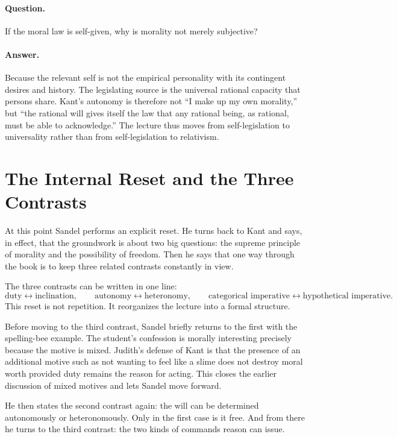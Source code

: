 \paragraph{Question.} If the moral law is self-given, why is morality not merely subjective?

\paragraph{Answer.} Because the relevant self is not the empirical personality with its contingent desires and history. The legislating source is the universal rational capacity that persons share. Kant's autonomy is therefore not ``I make up my own morality,'' but ``the rational will gives itself the law that any rational being, as rational, must be able to acknowledge.'' The lecture thus moves from self-legislation to universality rather than from self-legislation to relativism.

\section{The Internal Reset and the Three Contrasts}

At this point Sandel performs an explicit reset. He turns back to Kant and says, in effect, that the groundwork is about two big questions: the supreme principle of morality and the possibility of freedom. Then he says that one way through the book is to keep three related contrasts constantly in view.

The three contrasts can be written in one line:
\begin{equation}
\text{duty} \leftrightarrow \text{inclination},
\qquad
\text{autonomy} \leftrightarrow \text{heteronomy},
\qquad
\text{categorical imperative} \leftrightarrow \text{hypothetical imperative}.
\end{equation}
This reset is not repetition. It reorganizes the lecture into a formal structure.

Before moving to the third contrast, Sandel briefly returns to the first with the spelling-bee example. The student's confession is morally interesting precisely because the motive is mixed. Judith's defense of Kant is that the presence of an additional motive such as not wanting to feel like a slime does not destroy moral worth provided duty remains the reason for acting. This closes the earlier discussion of mixed motives and lets Sandel move forward.

He then states the second contrast again: the will can be determined autonomously or heteronomously. Only in the first case is it free. And from there he turns to the third contrast: the two kinds of commands reason can issue.

